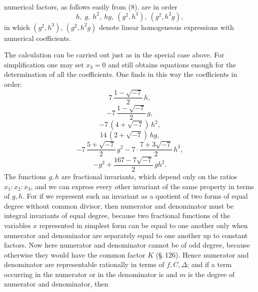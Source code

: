 
numerical factors, as follows easily from (8), are in order
\[
h,\ g,\ h^2,\ hg,\ (g^2,h^3),\ (g^2,h^2g),
\]
in which $(g^2,h^3)$, $(g^2,h^2g)$ denote linear homogeneous expressions
with numerical coefficients.

The calculation can be carried out just as in the special case
above. For simplification one may set $x_3=0$ and still obtains
equations enough for the determination of all the coefficients.
One finds in this way the coefficients in order:
\[
7\,\frac{1-\sqrt{-7}}{2}\,h,
\]
\[
-7\,\frac{1-\sqrt{-7}}{2}\,g,
\]
\[
-7\,(4+\sqrt{-7})\,h^2,
\]
\[
14\,(2+\sqrt{-7})\,hg,
\]
\[
-7\,\frac{5+\sqrt{-7}}{2}\,g^2 - 7\cdot\frac{7+3\sqrt{-7}}{2}\,h^3,
\]
\[
-g^2 + \frac{167-7\sqrt{-7}}{2}\,gh^2.
\]
The functions $g, h$ are fractional invariants, which depend only
on the ratios $x_1:x_2:x_3$, and we can express every other invariant
of the same property  in terms of $g, h$. For if
we represent such an invariant as a quotient of two forms of equal
degree without common divisor, then numerator and denominator
must be integral invariants of equal degree, because two fractional
functions of the variables $x$ represented in simplest form can be
equal to one another only when numerator and denominator are
separately equal to one another up to constant factors. Now here
numerator and denominator cannot be of odd degree, because
otherwise they would have the common factor $K$ (\S.\,126). Hence
numerator and denominator are representable rationally in terms of $f, C, \Delta$;
and if a term occurring in the numerator or in the denominator is
and $m$ is the degree of numerator and denominator, then

